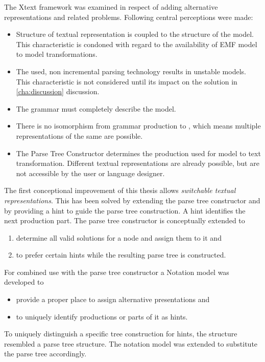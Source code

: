 The Xtext framework was examined in respect of adding alternative representations and related problems. Following central perceptions were made:
\begin{itemize}
	\item Structure of textual representation is coupled to the structure of the model. This characteristic is condoned with regard to the availability of EMF model to model transformations.
	\item The used, non incremental parsing technology results in unstable models. This characteristic is not considered until its impact on the solution in \ref{cha:discussion} discussion.
	\item The grammar must completely describe the model. 
	\item There is no isomorphism from grammar production to , which means multiple representations of the same  are possible.
	\item The Parse Tree Constructor determines the production used for model to text transformation. Different textual representations are already possible, but are not accessible by the user or language designer. \\
\end{itemize}
 
 
The first conceptional improvement of this thesis allows \emph{switchable textual representations}. This has been solved by extending the parse tree constructor and by providing a hint to guide the parse tree construction. A hint identifies the next production part.
The parse tree constructor is conceptually extended to
\begin{enumerate}
	\item determine all valid solutions for a node and assign them to it and
	\item to prefer certain hints while the resulting parse tree is constructed.
\end{enumerate}
For combined use with the parse tree constructor a Notation model was developed to
\begin{itemize}
	\item provide a proper place to assign alternative presentations and
	\item to uniquely identify productions or parts of it as hints.
\end{itemize}
To uniquely distinguish a specific tree construction for hints, the structure resembled a parse tree structure. The notation model was extended to substitute the parse tree accordingly.\\


